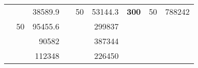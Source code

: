 \begin{table}[H]
\begin{tabular}{|ccrccrccc}
\rowcolor[HTML]{DDFDFF} 
\multicolumn{1}{|c|}{\cellcolor[HTML]{FFFFC7}}                                & \multicolumn{1}{c|}{\cellcolor[HTML]{DDFDFF}}                      & \multicolumn{1}{r|}{\cellcolor[HTML]{DAE8FC}38589.9}   & \multicolumn{1}{c|}{\cellcolor[HTML]{FFFFC7}}                                & \multicolumn{1}{c|}{\multirow{-10}{*}{\cellcolor[HTML]{DDFDFF}50}}  & \multicolumn{1}{r|}{\cellcolor[HTML]{DDFDFF}53144.3}   & \multicolumn{1}{c|}{\multirow{-19}{*}{\cellcolor[HTML]{FFFFC7}\textbf{300}}} & \multicolumn{1}{c|}{\multirow{-10}{*}{\cellcolor[HTML]{DDFDFF}50}} & \multicolumn{1}{r|}{\cellcolor[HTML]{DDFDFF}788242}    \\ \cline{3-3} \cline{5-9} 
\multicolumn{1}{|c|}{\cellcolor[HTML]{FFFFC7}}                                & \multicolumn{1}{c|}{\multirow{-10}{*}{\cellcolor[HTML]{DDFDFF}50}} & \multicolumn{1}{r|}{\cellcolor[HTML]{DDFDFF}95455.6}   & \multicolumn{1}{c|}{\cellcolor[HTML]{FFFFC7}}                                & \multicolumn{1}{c|}{\cellcolor[HTML]{DAE8FC}}                       & \multicolumn{1}{r|}{\cellcolor[HTML]{DAE8FC}299837}    &                                                                              &                                                                    &                                                        \\ \cline{2-3} \cline{6-6}
\multicolumn{1}{|c|}{\cellcolor[HTML]{FFFFC7}}                                & \multicolumn{1}{c|}{\cellcolor[HTML]{DAE8FC}}                      & \multicolumn{1}{r|}{\cellcolor[HTML]{DAE8FC}90582}     & \multicolumn{1}{c|}{\cellcolor[HTML]{FFFFC7}}                                & \multicolumn{1}{c|}{\cellcolor[HTML]{DAE8FC}}                       & \multicolumn{1}{r|}{\cellcolor[HTML]{DDFDFF}387344}    &                                                                              &                                                                    &                                                        \\ \cline{3-3} \cline{6-6}
\multicolumn{1}{|c|}{\cellcolor[HTML]{FFFFC7}}                                & \multicolumn{1}{c|}{\cellcolor[HTML]{DAE8FC}}                      & \multicolumn{1}{r|}{\cellcolor[HTML]{DDFDFF}112348}    & \multicolumn{1}{c|}{\cellcolor[HTML]{FFFFC7}}                                & \multicolumn{1}{c|}{\cellcolor[HTML]{DAE8FC}}                       & \multicolumn{1}{r|}{\cellcolor[HTML]{DAE8FC}226450}    &                                                                              &                                                                    &                                                        \\ \cline{3-3} \cline{6-6}

\end{tabular}
\end{table}
